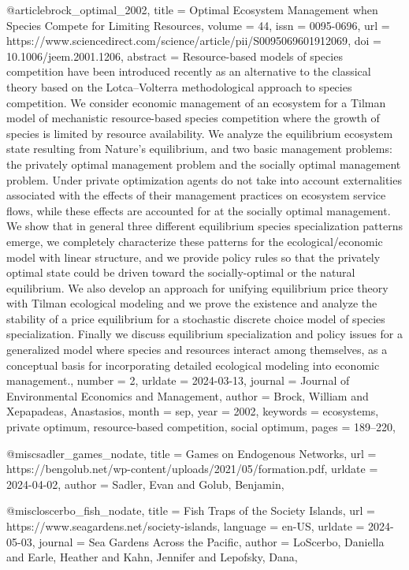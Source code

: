 {{{{@article{brock_optimal_2002,
	title = {Optimal {Ecosystem} {Management} when {Species} {Compete} for {Limiting} {Resources}},
	volume = {44},
	issn = {0095-0696},
	url = {https://www.sciencedirect.com/science/article/pii/S0095069601912069},
	doi = {10.1006/jeem.2001.1206},
	abstract = {Resource-based models of species competition have been introduced recently as an alternative to the classical theory based on the Lotca–Volterra methodological approach to species competition. We consider economic management of an ecosystem for a Tilman model of mechanistic resource-based species competition where the growth of species is limited by resource availability. We analyze the equilibrium ecosystem state resulting from Nature's equilibrium, and two basic management problems: the privately optimal management problem and the socially optimal management problem. Under private optimization agents do not take into account externalities associated with the effects of their management practices on ecosystem service flows, while these effects are accounted for at the socially optimal management. We show that in general three different equilibrium species specialization patterns emerge, we completely characterize these patterns for the ecological/economic model with linear structure, and we provide policy rules so that the privately optimal state could be driven toward the socially-optimal or the natural equilibrium. We also develop an approach for unifying equilibrium price theory with Tilman ecological modeling and we prove the existence and analyze the stability of a price equilibrium for a stochastic discrete choice model of species specialization. Finally we discuss equilibrium specialization and policy issues for a generalized model where species and resources interact among themselves, as a conceptual basis for incorporating detailed ecological modeling into economic management.},
	number = {2},
	urldate = {2024-03-13},
	journal = {Journal of Environmental Economics and Management},
	author = {Brock, William and Xepapadeas, Anastasios},
	month = sep,
	year = {2002},
	keywords = {ecosystems, private optimum, resource-based competition, social optimum},
	pages = {189--220},
}

@misc{sadler_games_nodate,
	title = {Games on {Endogenous} {Networks}},
	url = {https://bengolub.net/wp-content/uploads/2021/05/formation.pdf},
	urldate = {2024-04-02},
	author = {Sadler, Evan and Golub, Benjamin},
}

@misc{loscerbo_fish_nodate,
	title = {Fish {Traps} of the {Society} {Islands}},
	url = {https://www.seagardens.net/society-islands},
	language = {en-US},
	urldate = {2024-05-03},
	journal = {Sea Gardens Across the Pacific},
	author = {LoScerbo, Daniella and Earle, Heather and Kahn, Jennifer and Lepofsky, Dana},
}

}}}}
